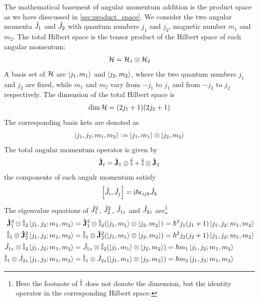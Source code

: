 The mathematical basement of angular momentum addition is the product space as we have disscussed in \cref{sec:product_space}. We consider the two angular momenta $\hat{J}_1$ and $\hat{J}_2$ with quantum numbers $j_1$ and $j_2$, magnetic number $m_1$ and $m_2$. 
The total Hilbert space is the tensor product of the Hilbert space of each angular momentum:
\begin{align}
    \mathcal{H} = \mathcal{H}_1 \otimes \mathcal{H}_2
\end{align}
A basis set of $\mathcal{H}$ are $\ket{j_1,m_1}$ and $\ket{j_2,m_2}$, where the two quantum numbers $j_1$ and $j_2$ are fixed, while $m_1$ and $m_2$ vary from $-j_1$ to $j_1$ and from $-j_2$ to $j_2$ respectively. The dimension of the total Hilbert space is
\begin{align}
    \dim{\mathcal{H}} = (2 j_1 + 1)(2 j_2 + 1)
\end{align}
The corresponding basis kets are denoted as
\begin{align}
    \ket{j_1,j_2;m_1,m_2} := \ket{j_1,m_1} \otimes \ket{j_2,m_2}
\end{align}
The total angular momentum operator is given by
\begin{align}
    \mathbf{\hat{J}}_t = \mathbf{\hat{J}}_1 \otimes \hat{\mathbb{I}} + \hat{\mathbb{I}} \otimes \mathbf{\hat{J}}_2
\end{align}
the components of each angulr momentum satisfy 
\begin{align}
    \left[ \hat{J}_i , \hat{J}_j \right] = \mathrm{i} \hbar \epsilon_{ijk} \hat{J}_k
\end{align}
The eigenvalue equations of $\hat{J}_1^2$, $\hat{J}_2^2$, $\hat{J}_{1z}$ and $\hat{J}_{2z}$ are\footnote{Here the footnote of $\hat{\mathbb{I}}$ does not denote the dimension, but the identity operator in the corresponding Hilbert space.}
\begin{align}
    \mathbf{\hat{J}}_1^2 \otimes \hat{\mathbb{I}}_2 \ket{j_1,j_2;m_1,m_2} & = \mathbf{\hat{J}}_1^2 \otimes \hat{\mathbb{I}}_2 (\ket{j_1,m_1} \otimes \ket{j_2,m_2}) =\hbar^2 j_1 (j_1 + 1) \ket{j_1,j_2;m_1,m_2} \\
    \hat{\mathbb{I}}_1 \otimes \mathbf{\hat{J}}_2^2 \ket{j_1,j_2;m_1,m_2} & = \hat{\mathbb{I}}_1 \otimes \mathbf{\hat{J}}_2^2 (\ket{j_1,m_1} \otimes \ket{j_2,m_2}) =\hbar^2 j_2 (j_2 + 1) \ket{j_1,j_2;m_1,m_2} \\
    \hat{J}_{1z} \otimes \hat{\mathbb{I}}_2 \ket{j_1,j_2;m_1,m_2} & = \hat{J}_{1z} \otimes \hat{\mathbb{I}}_2 (\ket{j_1,m_1} \otimes \ket{j_2,m_2}) = \hbar m_1 \ket{j_1,j_2;m_1,m_2} \\
    \hat{\mathbb{I}}_1 \otimes \hat{J}_{2z} \ket{j_1,j_2;m_1,m_2} & = \hat{\mathbb{I}}_1 \otimes \hat{J}_{2z} (\ket{j_1,m_1} \otimes \ket{j_2,m_2}) =\hbar m_2 \ket{j_1,j_2;m_1,m_2}  
\end{align}
